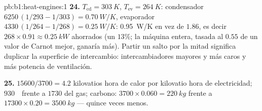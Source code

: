 \begin{solution}{pb:b1:heat-engines:1}
\textbf{24.} $T_{\mathrm{cd}} = \qty{303}{K}$, $T_{\mathrm{ev}} = \qty{264}{K}$:
condensador $6250\,(1/293 - 1/303) = \qty{0.70}{W/K}$, evaporador
$4330\,(1/264 - 1/268) = \qty{0.25}{W/K}$: \qty{0.95}{W/K} en vez de
$1.86$, es decir $268 \times 0.91 \approx \qty{0.25}{kW}$ ahorrados (un $13\%$; la
máquina entera, tasada al $0.55$ de un valor de Carnot mejor, ganaría
más). Partir un salto por la mitad significa duplicar la superficie de
intercambio: intercambiadores mayores y más caros y más potencia de ventilación.

\textbf{25.} $15600/3700 = 4.2$ kilovatios hora de calor por kilovatio hora
de electricidad; $930$~\texteuro\ frente a $1730$ del gas; carbono: $3700
\times 0.060 = \qty{220}{kg}$ frente a $17300 \times 0.20 = \qty{3500}{kg}$ ---
quince veces menos.
\end{solution}
